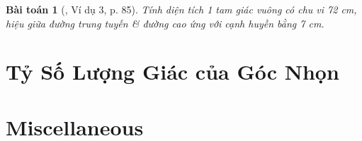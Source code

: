 \documentclass{article}
\newtheorem{baitoan}{Bài toán}
\begin{document}
\begin{baitoan}[\cite{Binh_Toan_9_tap_1}, Ví dụ 3, p. 85]
	Tính diện tích 1 tam giác vuông có chu vi {\rm72 cm}, hiệu giữa đường trung tuyến \& đường cao ứng với cạnh huyền bằng {\rm7 cm}.
\end{baitoan}


\section{Tỷ Số Lượng Giác của Góc Nhọn}


\section{Miscellaneous}


\printbibliography[heading=bibintoc]
\end{document}
